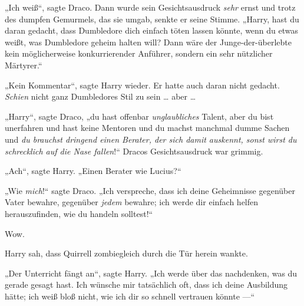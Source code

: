 „Ich weiß“, sagte Draco. Dann wurde sein Gesichtsausdruck \emph{sehr} ernst und trotz des dumpfen Gemurmels, das sie umgab, senkte er seine Stimme.
„Harry, hast du daran gedacht, dass Dumbledore dich einfach töten lassen könnte, wenn du etwas weißt, was Dumbledore geheim halten will? Dann wäre der Junge-der-überlebte kein möglicherweise konkurrierender Anführer, sondern ein sehr nützlicher Märtyrer.“

„Kein Kommentar“, sagte Harry wieder. Er hatte auch daran nicht gedacht. \emph{Schien} nicht ganz Dumbledores Stil zu sein … aber …

„Harry“, sagte Draco, „du hast offenbar \emph{unglaubliches} Talent, aber du bist unerfahren und hast keine Mentoren und du machst manchmal dumme Sachen und \emph{du brauchst dringend einen Berater, der sich damit auskennt, sonst wirst du schrecklich auf die Nase fallen}!“ Dracos Gesichtsausdruck war grimmig.

„Ach“, sagte Harry.
„Einen Berater wie Lucius?“

„Wie \emph{mich}!“ sagte Draco.
„Ich verspreche, dass ich deine Geheimnisse gegenüber Vater bewahre, gegenüber \emph{jedem} bewahre; ich werde dir einfach helfen herauszufinden, wie du handeln solltest!“

Wow.

Harry sah, dass Quirrell zombiegleich durch die Tür herein wankte.

„Der Unterricht fängt an“, sagte Harry.
„Ich werde über das nachdenken, was du gerade gesagt hast. Ich wünsche mir tatsächlich oft, dass ich deine Ausbildung hätte; ich weiß bloß nicht, wie ich dir so schnell vertrauen könnte —“

